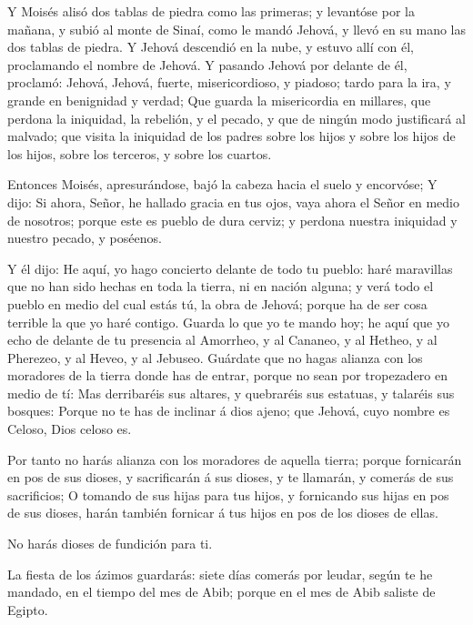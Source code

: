  Y Moisés alisó dos tablas de piedra como las primeras; y
levantóse por la mañana, y subió al monte de Sinaí, como le mandó
Jehová, y llevó en su mano las dos tablas de piedra.  Y
Jehová descendió en la nube, y estuvo allí con él, proclamando el nombre
de Jehová.  Y pasando Jehová por delante de él, proclamó:
Jehová, Jehová, fuerte, misericordioso, y piadoso; tardo para la ira, y
grande en benignidad y verdad;  Que guarda la misericordia
en millares, que perdona la iniquidad, la rebelión, y el pecado, y que
de ningún modo justificará al malvado; que visita la iniquidad de los
padres sobre los hijos y sobre los hijos de los hijos, sobre los
terceros, y sobre los cuartos.

 Entonces Moisés, apresurándose, bajó la cabeza hacia el
suelo y encorvóse;  Y dijo: Si ahora, Señor, he hallado
gracia en tus ojos, vaya ahora el Señor en medio de nosotros; porque
este es pueblo de dura cerviz; y perdona nuestra iniquidad y nuestro
pecado, y poséenos.

 Y él dijo: He aquí, yo hago concierto delante de todo tu
pueblo: haré maravillas que no han sido hechas en toda la tierra, ni en
nación alguna; y verá todo el pueblo en medio del cual estás tú, la obra
de Jehová; porque ha de ser cosa terrible la que yo haré contigo.
 Guarda lo que yo te mando hoy; he aquí que yo echo de
delante de tu presencia al Amorrheo, y al Cananeo, y al Hetheo, y al
Pherezeo, y al Heveo, y al Jebuseo.  Guárdate que no hagas
alianza con los moradores de la tierra donde has de entrar, porque no
sean por tropezadero en medio de tí:  Mas derribaréis sus
altares, y quebraréis sus estatuas, y talaréis sus bosques:
 Porque no te has de inclinar á dios ajeno; que Jehová,
cuyo nombre es Celoso, Dios celoso es.

 Por tanto no harás alianza con los moradores de aquella
tierra; porque fornicarán en pos de sus dioses, y sacrificarán á sus
dioses, y te llamarán, y comerás de sus sacrificios;  O
tomando de sus hijas para tus hijos, y fornicando sus hijas en pos de
sus dioses, harán también fornicar á tus hijos en pos de los dioses de
ellas.

 No harás dioses de fundición para ti.

 La fiesta de los ázimos guardarás: siete días comerás por
leudar, según te he mandado, en el tiempo del mes de Abib; porque en el
mes de Abib saliste de Egipto.

